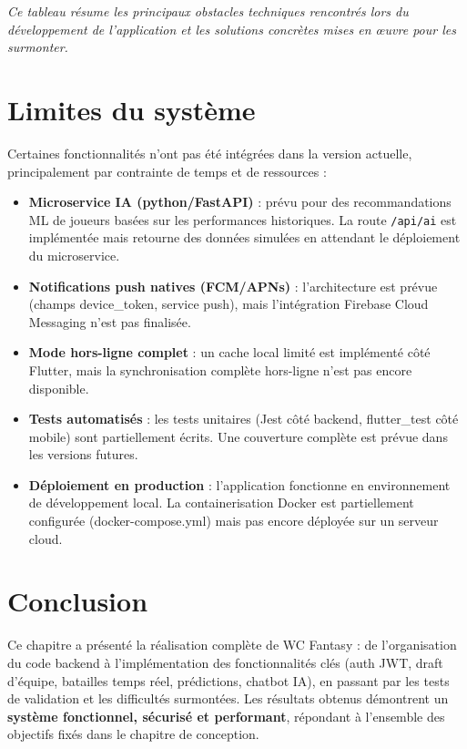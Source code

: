 \vspace{0.2cm}
\noindent\small\textit{Ce tableau résume les principaux obstacles techniques rencontrés lors du développement de l'application et les solutions concrètes mises en œuvre pour les surmonter.}\normalsize

\section{Limites du système}

Certaines fonctionnalités n'ont pas été intégrées dans la version actuelle, principalement par contrainte de temps et de ressources :

\begin{itemize}
    \item \textbf{Microservice IA (python/FastAPI)} : prévu pour des recommandations ML de joueurs basées sur les performances historiques. La route \texttt{/api/ai} est implémentée mais retourne des données simulées en attendant le déploiement du microservice.
    \item \textbf{Notifications push natives (FCM/APNs)} : l'architecture est prévue (champs device\_token, service push), mais l'intégration Firebase Cloud Messaging n'est pas finalisée.
    \item \textbf{Mode hors-ligne complet} : un cache local limité est implémenté côté Flutter, mais la synchronisation complète hors-ligne n'est pas encore disponible.
    \item \textbf{Tests automatisés} : les tests unitaires (Jest côté backend, flutter\_test côté mobile) sont partiellement écrits. Une couverture complète est prévue dans les versions futures.
    \item \textbf{Déploiement en production} : l'application fonctionne en environnement de développement local. La containerisation Docker est partiellement configurée (docker-compose.yml) mais pas encore déployée sur un serveur cloud.
\end{itemize}

\section*{Conclusion}

Ce chapitre a présenté la réalisation complète de WC Fantasy : de l'organisation du code backend à l'implémentation des fonctionnalités clés (auth JWT, draft d'équipe, batailles temps réel, prédictions, chatbot IA), en passant par les tests de validation et les difficultés surmontées. Les résultats obtenus démontrent un \textbf{système fonctionnel, sécurisé et performant}, répondant à l'ensemble des objectifs fixés dans le chapitre de conception.
